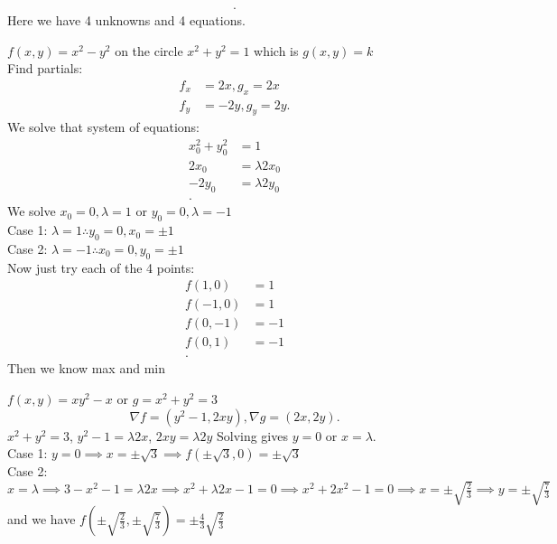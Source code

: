 \begin{itemize}
\begin{align*}
		.\end{align*}
		Here we have 4 unknowns and 4 equations.
		\begin{example}
			$f\left( x,y \right)  = x^2 - y^2$ on the circle $x^2 + y^2 = 1$ which is $g\left( x,y \right) = k$\\
			Find partials:
			\begin{align*}
				f_x &= 2x, g_x = 2x\\
				f_y &= -2y,  g_y= 2y
			.\end{align*}
			We solve that system of equations:
			\begin{align*}
				x_0^2 + y_0^2 &= 1 \\
				2x_0 &= \lambda 2x_0\\
				-2y_0 &= \lambda 2y_0 \\
			.\end{align*}
			We solve $x_0 = 0, \lambda = 1 \text{ or } y_0 = 0, \lambda = -1$\\
			Case 1: $\lambda = 1 \therefore  y_0 = 0, x_0 = \pm 1$\\
			Case 2: $\lambda = -1 \therefore  x_0 = 0, y_0 = \pm 1$\\
			Now just try each of the 4 points:
			\begin{align*}
				f\left( 1,0 \right)  &= 1 \\
				f\left( -1,0 \right)  &=  1 \\
				f\left( 0, -1 \right)  &=  -1 \\
				f\left( 0,1 \right)  &=  -1 \\
			.\end{align*}
			Then we know max and min
		\end{example}
		\begin{example}
			$f\left( x,y \right)  = xy^2 - x$ or $g = x^2 + y^2 = 3$ \\
			\[
			\nabla f = \left( y^2 - 1, 2xy \right), \nabla g = \left( 2x, 2y \right) 
			.\] 
			$x^2 + y^2 = 3$, $y^2 - 1 = \lambda 2x$, $2xy = \lambda 2y$ Solving gives  $ y = 0$ or  $x = \lambda$.\\
			Case 1:  $ y = 0 \implies x = \pm \sqrt{ 3} \implies f\left( \pm \sqrt{3} , 0 \right)  = \pm \sqrt{3} $ \\
			Case 2: $ x = \lambda \implies 3 - x^2 - 1 = \lambda 2x \implies x^2 + \lambda 2x - 1 = 0 \implies x^2 + 2x^2 - 1 = 0 \implies x = \pm \sqrt{\frac{2}{3}} \implies y = \pm \sqrt{\frac{7}{3}} $ and we have $f\left( \pm \sqrt{\frac{2}{3}} , \pm \sqrt{\frac{7}{3}}  \right) = \pm \frac{4}{3 } \sqrt{ \frac{2}{3}} $
		\end{example}
\end{itemize}
